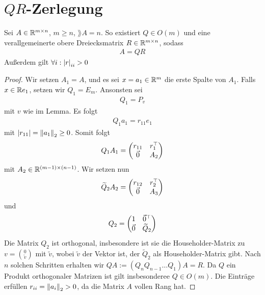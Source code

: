 \documentclass{report}
\begin{document}
\section{$QR$-Zerlegung}
\begin{theorem}
	Sei $A \in \mathbb{R}^{m \times n}$, $m \geq n$, $\rang A = n$. So existiert $Q \in O(m)$ und eine verallgemeinerte obere Dreiecksmatrix $R \in \mathbb{R}^{m \times n}$, sodass
	\begin{align*}
		A = QR
	\end{align*}
	Außerdem gilt $\forall i : \abs{r}_{ii} > 0$
\end{theorem}
\begin{proof}
	Wir setzen $A_1 = A$, und es sei $x = a_1 \in \mathbb{R}^m$ die erste Spalte von $A_1$. Falls $x \in \mathbb{R}{e_1}$, setzen wir $Q_1 = E_m$. Ansonsten sei
	\begin{align*}
		Q_1 = P_v
	\end{align*}
	mit $v$ wie im Lemma. Es folgt
	\begin{align*}
		Q_1 a_1 = r_{11}e_1
	\end{align*}
	mit $\abs{r_{11}} = \norm{a_1}_2 \geq 0$. Somit folgt
	\begin{align*}
		Q_1 A_1 = 
		\begin{pmatrix}
			r_{11} & r_1^\top\\
			\vec{0} & A_2
		\end{pmatrix}
	\end{align*}
	mit $A_2 \in \mathbb{R}^{(m-1) \times (n-1)}$.
	Wir setzen nun
	\begin{align*}
		\widetilde Q_2 A_2 = 
		\begin{pmatrix}
			r_{12} & r_2^\top\\
			\vec{0} & A_3
		\end{pmatrix}
	\end{align*}
	und
	\begin{align*}
		Q_2 = \begin{pmatrix}
			1 & \vec{0}^\top\\
			\vec{0} & \widetilde Q_2
		\end{pmatrix}
	\end{align*}
	Die Matrix $Q_2$ ist orthogonal, insbesondere ist sie die Householder-Matrix zu $v = \binom{0}{\tilde v}$ mit $\tilde v$, wobei $\tilde v$ der Vektor ist, der $\tilde Q_2$ als Householder-Matrix gibt.
	\newpar
	Nach $n$ solchen Schritten erhalten wir $QA := (Q_nQ_{n-1} \hdots Q_1) A = R$. Da $Q$ ein Produkt orthogonaler Matrizen ist gilt insbesonderee $Q \in O(m)$. Die Einträge erfüllen $r_{ii} = \norm{a_i}_2 > 0$, da die Matrix $A$ vollen Rang hat.
\end{proof}
\end{document}
